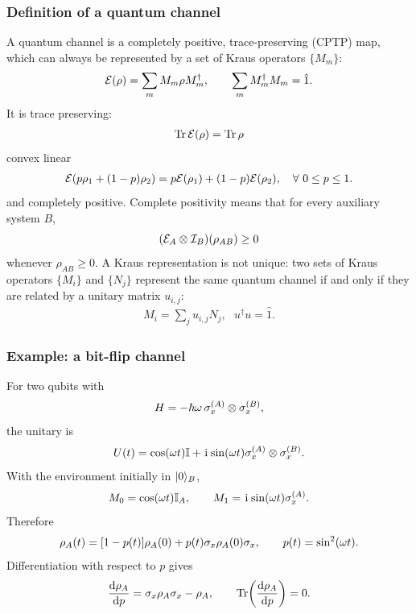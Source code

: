 \subsubsection{Definition of a quantum channel}

A quantum channel is a completely positive, trace-preserving (CPTP) map, which can always be represented by a set of Kraus operators $\{M_m\}$:
\begin{equation}
 \mathcal{E}(\rho)=\sum_mM_m\rho M_m^\dagger,
 \qquad \sum_mM_m^\dagger M_m=\hat1.
\end{equation}
It is trace preserving:
\begin{align}
    \operatorname{Tr}\mathcal{E}(\rho)=\operatorname{Tr}\rho
\end{align}
convex linear
\begin{align}
    \mathcal{E}(p\rho_1+(1-p)\rho_2)=p\mathcal{E}(\rho_1)+(1-p)\mathcal{E}(\rho_2),~~~\forall~0\leq p\leq1.
\end{align}
and completely positive. Complete
positivity means that for every auxiliary system $B$,
\begin{equation}
 (\mathcal{E}_A\otimes\mathcal I_B)(\rho_{AB})\geq0
\end{equation}
whenever $\rho_{AB}\geq0$. A Kraus representation is not unique: two sets of Kraus operators $\{M_i\}$ and $\{N_j\}$ represent the same quantum channel if and only if they are related by a unitary matrix $u_{i,j}$:
\begin{align}
    M_i=\sum_ju_{i,j}N_j,~~~u^\dagger u=\hat1.
\end{align}


\subsubsection{Example: a bit-flip channel}
For two qubits with
\begin{equation}
 H=-\hbar\omega\,\sigma_x^{(A)}\otimes\sigma_x^{(B)},
\end{equation}
the unitary is
\begin{equation}
 U(t)=\cos(\omega t)\mathbb{I}
 +\hspace{1pt}\mathrm{i}\hspace{1pt}\sin(\omega t)\sigma_x^{(A)}\otimes\sigma_x^{(B)}.
\end{equation}
With the environment initially in $|{0}\rangle_B$,
\begin{equation}
 M_0=\cos(\omega t)\mathbb{I}_A,
 \qquad M_1=\hspace{1pt}\mathrm{i}\hspace{1pt}\sin(\omega t)\sigma_x^{(A)}.
\end{equation}
Therefore
\begin{equation}
 \rho_A(t)=[1-p(t)]\rho_A(0)+p(t)\sigma_x\rho_A(0)\sigma_x,
 \qquad p(t)=\sin^2(\omega t).
\end{equation}
Differentiation with respect to $p$ gives
\begin{equation}
 \frac{\mathrm{d}\rho_A}{\mathrm{d} p}=\sigma_x\rho_A\sigma_x-\rho_A,
 \qquad \operatorname{Tr}\!\left(\frac{\mathrm{d}\rho_A}{\mathrm{d} p}\right)=0.
\end{equation}

